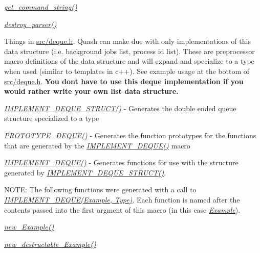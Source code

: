 \begin{DoxyItemize}
\item {\itshape \hyperlink{quash_8c_ab43880685b2507434e4a84f2cb9d54d4}{get\+\_\+command\+\_\+string()}} 
\item {\itshape \hyperlink{parsing__interface_8h_a659361d40550d9776b6ea7fa69a836ce}{destroy\+\_\+parser()}} 
\item Things in \hyperlink{deque_8h}{src/deque.\+h}. Quash can make due with only implementations of this data structure (i.\+e. background jobs list, process id list). These are preprocessor macro definitions of the data structure and will expand and specialize to a type when used (similar to templates in c++). See example usage at the bottom of \hyperlink{deque_8h}{src/deque.\+h}. {\bfseries You don\textquotesingle{}t have to use this deque implementation if you would rather write your own list data structure.}
\begin{DoxyItemize}
\item {\itshape \hyperlink{deque_8h_a091cfc1289538b13036bcd36d12a3c01}{I\+M\+P\+L\+E\+M\+E\+N\+T\+\_\+\+D\+E\+Q\+U\+E\+\_\+\+S\+T\+R\+U\+C\+T()}} -\/ Generates the double ended queue structure specialized to a type
\item {\itshape \hyperlink{deque_8h_af9dc10c0d5c775afe3053629e39f8c36}{P\+R\+O\+T\+O\+T\+Y\+P\+E\+\_\+\+D\+E\+Q\+U\+E()}} -\/ Generates the function prototypes for the functions that are generated by the {\itshape \hyperlink{deque_8h_a71fbe309fa88eb8d294b141f33d81233}{I\+M\+P\+L\+E\+M\+E\+N\+T\+\_\+\+D\+E\+Q\+U\+E()}} macro
\item {\itshape \hyperlink{deque_8h_a71fbe309fa88eb8d294b141f33d81233}{I\+M\+P\+L\+E\+M\+E\+N\+T\+\_\+\+D\+E\+Q\+U\+E()}} -\/ Generates functions for use with the structure generated by {\itshape \hyperlink{deque_8h_a091cfc1289538b13036bcd36d12a3c01}{I\+M\+P\+L\+E\+M\+E\+N\+T\+\_\+\+D\+E\+Q\+U\+E\+\_\+\+S\+T\+R\+U\+C\+T()}}.
\begin{DoxyItemize}
\item N\+O\+TE\+: The following functions were generated with a call to {\itshape \hyperlink{deque_8h_a71fbe309fa88eb8d294b141f33d81233}{I\+M\+P\+L\+E\+M\+E\+N\+T\+\_\+\+D\+E\+Q\+U\+E(\+Example, Type)}}. Each function is named after the contents passed into the first argment of this macro (in this case {\itshape \hyperlink{structExample}{Example}}).
\item {\itshape \hyperlink{deque_8h_ae0c6f52c89e2b087e19e3062186144da}{new\+\_\+\+Example()}} 
\item {\itshape \hyperlink{deque_8h_a4a210705b6f22fe97b7033bb8854a4d6}{new\+\_\+destructable\+\_\+\+Example()}} 

\end{DoxyItemize}
\end{DoxyItemize}
\end{DoxyItemize}
